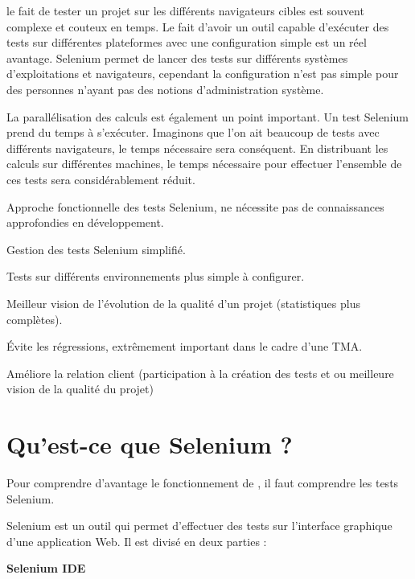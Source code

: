 le fait de tester un projet 
sur les différents navigateurs cibles est souvent complexe et couteux en temps.  Le fait d'avoir un outil capable d'exécuter
des tests sur différentes plateformes avec une configuration simple est un réel avantage.
Selenium permet de lancer des tests sur différents systèmes d'exploitations et navigateurs, 
cependant la configuration n'est pas simple pour des personnes n'ayant pas des notions 
d'administration système. 

La parallélisation des calculs est également un point important.  Un test Selenium prend du 
temps à s'exécuter. Imaginons que l'on ait  beaucoup de tests avec différents navigateurs, le
temps nécessaire sera conséquent. En distribuant les calculs sur différentes machines, le temps
nécessaire pour effectuer l'ensemble de ces tests sera considérablement réduit. 

\begin{description}
	\item \positif{}
	  Approche fonctionnelle des tests Selenium, ne nécessite pas de connaissances approfondies en développement.
	\item \positif{}  Gestion des tests Selenium simplifié.
	\item \positif{}  Tests sur différents environnements plus simple à configurer.
	\item \positif{}  Meilleur vision de l'évolution de la qualité d'un projet (statistiques plus complètes).
	\item \positif{}  Évite les régressions, extrêmement important dans le cadre d'une TMA.
	\item \positif{}  Améliore la relation client (participation à la création des tests et ou meilleure vision de la qualité du projet)
\end{description}


\section{Qu'est-ce que Selenium ?}
Pour comprendre d'avantage le fonctionnement de \youTestIt{}, il faut comprendre les tests Selenium.

Selenium est un outil qui permet d'effectuer des tests sur l'interface graphique d'une application Web. Il 
est divisé en deux parties :

\textbf{Selenium IDE}

